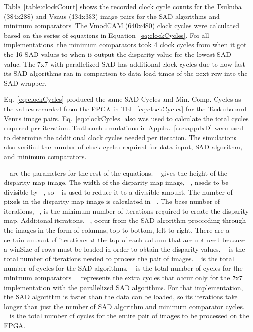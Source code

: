 Table~\ref{table:clockCount} shows the recorded clock cycle counts for the Tsukuba (384x288) and Venus (434x383) image pairs for the SAD algorithms and minimum comparators. The VmodCAM (640x480) clock cycles were calculated based on the series of equations in Equation~\ref{eq:clockCycles}. For all implementations, the minimum comparators took 4 clock cycles from when it got the 16 SAD values to when it output the disparity value for the lowest SAD value. The 7x7 with parallelized SAD has additional clock cycles due to how fast its SAD algorithms ran in comparison to data load times of the next row into the SAD wrapper.

Eq.~\ref{eq:clockCycles} produced the same SAD Cycles and Min. Comp. Cycles as the values recorded from the FPGA in Tbl.~\ref{eq:clockCycles} for the Tsukuba and Venus image pairs. Eq.~\ref{eq:clockCycles} also was used to calculate the total cycles required per iteration. Testbench simulations in Appdx.~\ref{sec:appdxD} were used to determine the additional clock cycles needed per iteration. The simulations also verified the number of clock cycles required for data input, SAD algorithm, and minimum comparators.

~ are the parameters for the rest of the equations. ~ gives the height of the disparity map image. The width of the disparity map image, ~, needs to be divisible by ~, so ~ is used to reduce it to a divisible amount. The number of pixels in the disparity map image is calculated in ~. The base number of iterations, ~, is the minimum number of iterations required to create the disparity map. Additional iterations, ~, occur from the SAD algorithm proceeding through the images in the form of columns, top to bottom, left to right. There are a certain amount of iterations at the top of each column that are not used because a winSize of rows must be loaded in order to obtain the disparity values. ~ is the total number of iterations needed to process the pair of images. ~ is the total number of cycles for the SAD algorithms. ~ is the total number of cycles for the minimum comparators. ~ represents the extra cycles that occur only for the 7x7 implementation with the parallelized SAD algorithms. For that implementation, the SAD algorithm is faster than the data can be loaded, so its iterations take longer than just the number of SAD algorithm and minimum comparator cycles. ~ is the total number of cycles for the entire pair of images to be processed on the FPGA.

